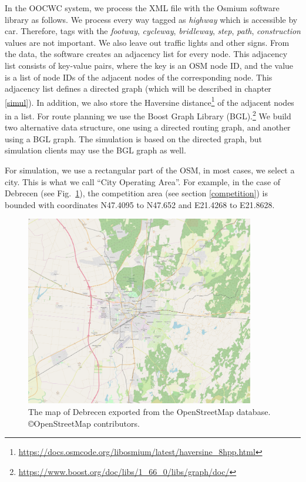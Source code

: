 \documentclass[b5paper,12pt]{report}
\theoremstyle{definition}
\begin{document}
In the OOCWC system, we process the XML file with the Osmium software library as follows. We process every way tagged as \textit{highway} which is accessible by car. Therefore, tags with the \textit{footway}, \textit{cycleway}, \textit{bridleway}, \textit{step}, \textit{path}, \textit{construction} values are not important. We also leave out traffic lights and other signs. From the data, the software creates an adjacency list for every node. This adjacency list consists of key-value pairs, where the key is an OSM node ID, and the value is a list of node IDs of the adjacent nodes of the corresponding node. This adjacency list defines a directed graph (which will be described in chapter \ref{simul}). In addition, we also store the Haversine distance\footnote{\url{https://docs.osmcode.org/libosmium/latest/haversine_8hpp.html}} of the adjacent nodes in a list. For route planning we use the Boost Graph Library (BGL).\footnote{\url{https://www.boost.org/doc/libs/1_66_0/libs/graph/doc/}} We build two alternative data structure, one using a directed routing graph, and another using a BGL graph. The simulation is based on the directed graph, but simulation clients may use the BGL graph as well.

For simulation, we use a rectangular part of the OSM, in most cases, we select a city. This is what we call \enquote{City Operating Area}. For example, in the case of Debrecen (see Fig.~\ref{debrecen_map}), the competition area (see section \ref{competition}) is bounded with coordinates N47.4095 to N47.652 and E21.4268 to E21.8628.

\begin{figure}[ht!]
\centering
\includegraphics[width=10cm]{img/debrecen_coa.png}
\caption{The map of Debrecen exported from the OpenStreetMap database. \copyright OpenStreetMap contributors.}
\label{debrecen_map}
\end{figure}
\end{document}
